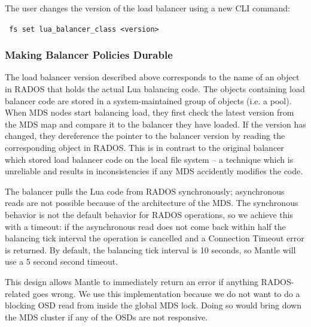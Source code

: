 \documentclass[preprint]{sigplanconf-eurosys}
\begin{document}
The user changes the version of the load balancer using a new CLI command:

\noindent \texttt{ fs\ set\ lua\_balancer\_class\ \textless{}version\textgreater{}}


\subsubsection{Making Balancer Policies Durable}

The load balancer version described above corresponds to the name of an object
in RADOS that holds the actual Lua balancing code. The objects containing load
balancer code are stored in a system-maintained group of objects (i.e. a pool).
When MDS nodes start balancing load, they first check the latest version from
the MDS map and compare it to the balancer they have loaded. If the version has
changed, they dereference the pointer to the balancer version by reading the
corresponding object in RADOS. This is in contrast to the original balancer
which stored load balancer code on the local file system -- a technique which
is unreliable and results in inconsistencies if any MDS accidently modifies the
code.

The balancer pulls the Lua code from RADOS synchronously; asynchronous reads
are not possible because of the architecture of the MDS. The synchronous
behavior is not the default behavior for RADOS operations, so we achieve this
with a timeout: if the asynchronous read does not come back within half the
balancing tick interval the operation is cancelled and a Connection Timeout
error is returned. By default, the balancing tick interval is 10 seconds, so
Mantle will use a 5 second second timeout.

This design allows Mantle to immediately return an error if anything
RADOS-related goes wrong.  We use this implementation because we do not want to
do a blocking OSD read from inside the global MDS lock. Doing so would bring
down the MDS cluster if any of the OSDs are not responsive.
\end{document}

